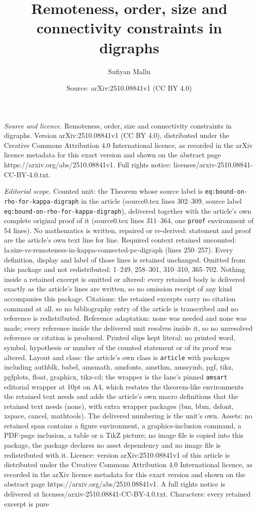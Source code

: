 \documentclass[10pt,a4paper]{amsart}
\title[Remoteness, order, size and connectivity constraints in digr]{Remoteness, order, size and connectivity constraints in digraphs}
\author{Sufiyan Mallu}
\date{Source: arXiv:2510.08841v1 (CC BY 4.0)}
\begin{document}
\maketitle

\noindent\emph{Source and licence.} Remoteness, order, size and connectivity constraints in digraphs. Version arXiv:2510.08841v1 (CC BY 4.0), distributed under the Creative Commons Attribution 4.0 International licence, as recorded in the arXiv licence metadata for this exact version and shown on the abstract page https://arxiv.org/abs/2510.08841v1. Full rights notice: licenses/arxiv-2510.08841-CC-BY-4.0.txt.\par\smallskip

\noindent\textit{Editorial scope.} Counted unit: the Theorem whose source label is \texttt{eq:bound-on-rho-for-kappa-digraph} in the article (source0.tex lines 302--309, source label \texttt{eq:bound-on-rho-for-kappa-digraph}), delivered together with the article's own complete original proof of it (source0.tex lines 311--364, one \texttt{proof} environment of 54 lines). No mathematics is written, repaired or re-derived: statement and proof are the article's own text line for line. Required context retained uncounted: la:size-vs-remoteness-in-kappa-connected-pc-digraph (lines 250--257). Every definition, display and label of those lines is retained unchanged. Omitted from this package and not redistributed: 1--249, 258--301, 310--310, 365--702. Nothing inside a retained excerpt is omitted or altered: every retained body is delivered exactly as the article's lines are written, so no omission receipt of any kind accompanies this package. Citations: the retained excerpts carry no citation command at all, so no bibliography entry of the article is transcribed and no reference is redistributed. Reference adaptation: none was needed and none was made; every reference inside the delivered unit resolves inside it, so no unresolved reference or citation is produced. Printed slips kept literal: no printed word, symbol, hypothesis or number of the counted statement or of its proof was altered. Layout and class: the article's own class is \texttt{article} with packages including authblk, babel, amsmath, amsfonts, amsthm, amssymb, pgf, tikz, pgfplots, float, graphicx, tikz-cd; the wrapper is the lane's pinned \texttt{amsart} editorial wrapper at 10pt on A4, which restates the theorem-like environments the retained text needs and adds the article's own macro definitions that the retained text needs (none), with extra wrapper packages (bm, bbm, dsfont, xspace, cancel, mathtools). The delivered numbering is the unit's own. Assets: no retained span contains a figure environment, a graphics-inclusion command, a PDF-page inclusion, a table or a TikZ picture; no image file is copied into this package, the package declares no asset dependency and no image file is redistributed with it. Licence: version arXiv:2510.08841v1 of this article is distributed under the Creative Commons Attribution 4.0 International licence, as recorded in the arXiv licence metadata for this exact version and shown on the abstract page https://arxiv.org/abs/2510.08841v1. A full rights notice is delivered at licenses/arxiv-2510.08841-CC-BY-4.0.txt. Characters: every retained excerpt is pure 
\end{document}

